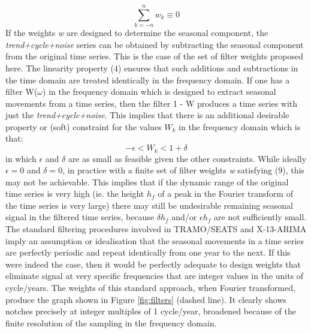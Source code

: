 \documentclass[english,blauw]{cbsdiscussionpaper}
\begin{document}
\begin{equation}
\sum \limits_{k=-n}^n w_k \equiv 0
\end{equation}
If the weights \textit{w} are designed to determine the seasonal component, the \textit{trend+cycle+noise} series can be obtained by subtracting the seasonal component from the original time series. This is the case of the set of filter weights proposed  here. The linearity property (4) ensures that such additions and subtractions in the time domain are treated identically in the frequency domain. If one has a filter W($\omega$) in the frequency domain which is designed to extract seasonal movements from a time series, then the filter 1 - W produces a time series with just the \textit{trend+cycle+noise}. This implies that there is an additional desirable property or (soft) constraint for the values $W_k$ in the frequency domain which is that:
\begin{equation}
-\epsilon < W_k < 1+\delta
\end{equation}
in which $\epsilon$ and $\delta$ are as small as feasible given the other constraints. While ideally $\epsilon=0$ and $\delta=0$, in practice with a finite set of filter weights \textit{w} satisfying (9), this may not be achievable. This implies that if the dynamic range of the original time series is very high (ie. the height $h_f$ of a peak in the Fourier transform of the time series is very large) there may still be undesirable remaining seasonal signal in the filtered time series, because $\delta h_f$ and/or $\epsilon h_f$ are not sufficiently small.\\The standard filtering procedures involved in TRAMO/SEATS and X-13-ARIMA imply an assumption or idealisation that the seasonal movements in a time series are perfectly periodic and repeat identically from one year to the next. If this were indeed the case, then it would be perfectly adequate to design weights that eliminate signal at very specific frequencies that are integer values in the units of cycle/years. The weights of this standard approach, when Fourier transformed, produce the graph shown in Figure \ref{fig:filters} (dashed line). It clearly shows notches precisely at integer multiples of 1 cycle/year, broadened because of the finite resolution of the sampling in the frequency domain.\\
\end{document}

